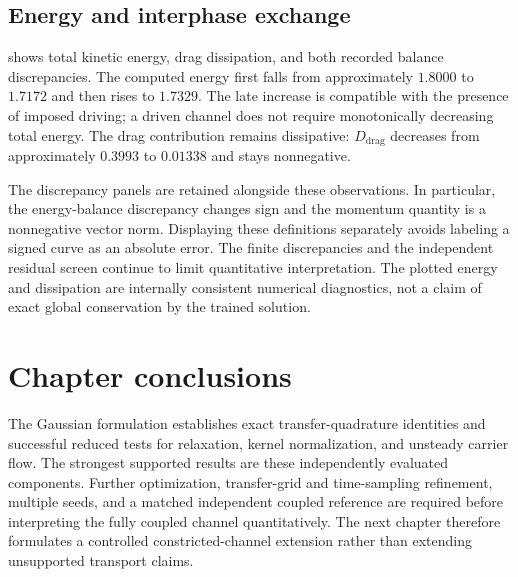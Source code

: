 
\subsection{Energy and interphase exchange}
 shows total kinetic energy, drag dissipation,
and both recorded balance discrepancies. The computed energy first falls
from approximately $1.8000$ to $1.7172$ and then rises to $1.7329$.
The late increase is compatible with the presence of imposed driving; a
driven channel does not require monotonically decreasing total energy.
The drag contribution remains dissipative: $D_{\mathrm{drag}}$ decreases
from approximately $0.3993$ to $0.01338$ and stays nonnegative.

The discrepancy panels are retained alongside these observations. In
particular, the energy-balance discrepancy changes sign and the momentum
quantity is a nonnegative vector norm. Displaying these definitions
separately avoids labeling a signed curve as an absolute error. The
finite discrepancies and the independent residual screen continue to
limit quantitative interpretation. The plotted energy and dissipation
are internally consistent numerical diagnostics, not a claim of exact
global conservation by the trained solution.


\section{Chapter conclusions}
The Gaussian formulation establishes exact transfer-quadrature identities
and successful reduced tests for relaxation, kernel normalization, and
unsteady carrier flow. The strongest supported results are these
independently evaluated components. Further optimization, transfer-grid
and time-sampling refinement, multiple seeds, and a matched independent
coupled reference are required before interpreting the fully coupled
channel quantitatively. The next chapter therefore formulates a controlled
constricted-channel extension rather than extending unsupported transport
claims.
